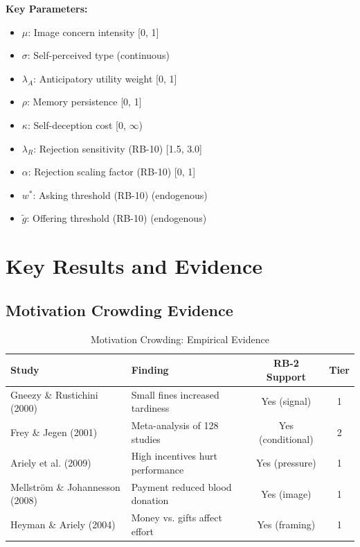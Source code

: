 \textbf{Key Parameters:}
\begin{itemize}
    \item $\mu$: Image concern intensity [0, 1]
    \item $\sigma$: Self-perceived type (continuous)
    \item $\lambda_A$: Anticipatory utility weight [0, 1]
    \item $\rho$: Memory persistence [0, 1]
    \item $\kappa$: Self-deception cost [0, $\infty$)
    \item $\lambda_R$: Rejection sensitivity (RB-10) [1.5, 3.0]
    \item $\alpha$: Rejection scaling factor (RB-10) [0, 1]
    \item $w^*$: Asking threshold (RB-10) (endogenous)
    \item $\tilde{g}$: Offering threshold (RB-10) (endogenous)
\end{itemize}

\section{Key Results and Evidence}
\label{sec:rb-results}

\subsection{Motivation Crowding Evidence}

\begin{table}[htbp]
\centering
\caption{Motivation Crowding: Empirical Evidence}
\label{tab:rb-crowding}
\begin{tabular}{llcc}
\toprule
\textbf{Study} & \textbf{Finding} & \textbf{RB-2 Support} & \textbf{Tier} \\
\midrule
Gneezy \& Rustichini (2000) & Small fines increased tardiness & Yes (signal) & 1 \\
Frey \& Jegen (2001) & Meta-analysis of 128 studies & Yes (conditional) & 2 \\
Ariely et al. (2009) & High incentives hurt performance & Yes (pressure) & 1 \\
Mellström \& Johannesson (2008) & Payment reduced blood donation & Yes (image) & 1 \\
Heyman \& Ariely (2004) & Money vs. gifts affect effort & Yes (framing) & 1 \\
\bottomrule
\end{tabular}
\end{table}

